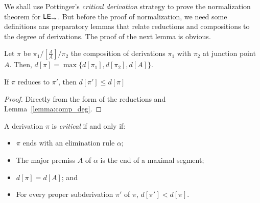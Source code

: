 
We shall use Pottinger's \emph{critical derivation} strategy to prove the normalization theorem for $\mathsf{LE}_{\to}$. But before the proof of normalization, we need some definitions ans preparatory lemmas that relate reductions and compositions to the degree of derivations. The proof of the next lemma is obvious.

\begin{lemma}\label{lemma:comp_deg}
  Let $\pi$ be $\pi_1/[\tfrac{A}{A}]/\pi_2$ the composition of derivations $\pi_1$ with $\pi_2$ at junction point $A$. Then, $d[\pi] = \max\{d[\pi_1], d[\pi_2], d[A]\}$.
\end{lemma}

\begin{lemma}\label{lemma:reduction}
  If $\pi$ reduces to $\pi'$, then $d[\pi']\leq d[\pi]$
\end{lemma}
\begin{proof}
  Directly from the form of the reductions and Lemma~\ref{lemma:comp_deg}.
\end{proof}

\begin{definition}
  A derivation $\pi$ is \emph{critical} if and only if:
  \begin{itemize}
  \item $\pi$ ends with an elimination rule $\alpha$;
  \item The major premiss $A$ of $\alpha$ is the end of a maximal segment;
  \item $d[\pi]=d[A]$; and
  \item For every proper subderivation $\pi'$ of $\pi$, $d[\pi']<d[\pi]$.
  \end{itemize}
\end{definition}

